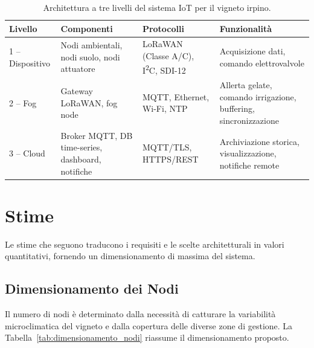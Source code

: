 \begin{table}[H]
	\centering
	\small
	\begin{tabularx}{\textwidth}{|l|X|X|X|}
		\hline
		\textbf{Livello} & \textbf{Componenti} & \textbf{Protocolli} & \textbf{Funzionalità} \\
		\hline
		1 -- Dispositivo & Nodi ambientali, nodi suolo, nodi attuatore & LoRaWAN (Classe A/C), I\textsuperscript{2}C, SDI-12 & Acquisizione dati, comando elettrovalvole \\
		\hline
		2 -- Fog & Gateway LoRaWAN, fog node & MQTT, Ethernet, Wi-Fi, NTP & Allerta gelate, comando irrigazione, buffering, sincronizzazione \\
		\hline
		3 -- Cloud & Broker MQTT, DB time-series, dashboard, notifiche & MQTT/TLS, HTTPS/REST & Archiviazione storica, visualizzazione, notifiche remote \\
		\hline
	\end{tabularx}
	\caption{Architettura a tre livelli del sistema IoT per il vigneto irpino.}
	\label{tab:architettura_livelli}
\end{table}


\section{Stime}

Le stime che seguono traducono i requisiti e le scelte architetturali in valori quantitativi, fornendo un dimensionamento di massima del sistema.

\subsection{Dimensionamento dei Nodi}

Il numero di nodi è determinato dalla necessità di catturare la variabilità microclimatica del vigneto e dalla copertura delle diverse zone di gestione. La Tabella~\ref{tab:dimensionamento_nodi} riassume il dimensionamento proposto.

